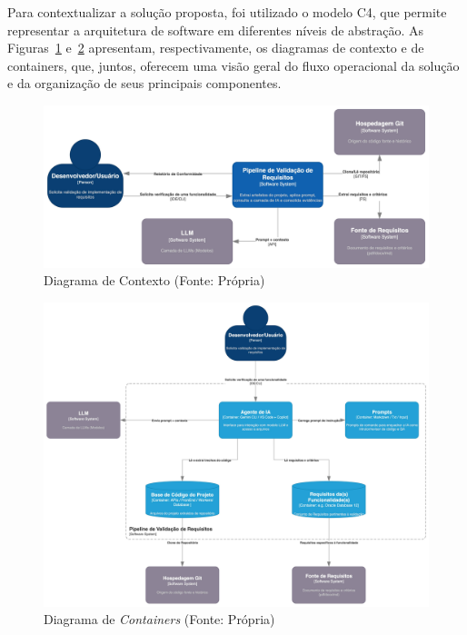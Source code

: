 Para contextualizar a solução proposta, foi utilizado o modelo C4, que permite representar a arquitetura de software em diferentes níveis de abstração. As Figuras~\ref{fig:c4_contexto} e~\ref{fig:c4_containers} apresentam, respectivamente, os diagramas de contexto e de containers, que, juntos, oferecem uma visão geral do fluxo operacional da solução e da organização de seus principais componentes.

\begin{figure}[H]
    \centering
    \begin{adjustbox}{width=1.0\textwidth,center}
        \includegraphics{imgs/c4_context.jpeg}
    \end{adjustbox}
    \caption{Diagrama de Contexto (Fonte: Própria)}
    \label{fig:c4_contexto}
\end{figure}

\begin{figure}[H]
    \centering
    \begin{adjustbox}{width=1.0\textwidth,center}
        \includegraphics{imgs/c4_container.jpeg}
    \end{adjustbox}
    \caption{Diagrama de \textit{Containers} (Fonte: Própria)}
    \label{fig:c4_containers}
\end{figure}

